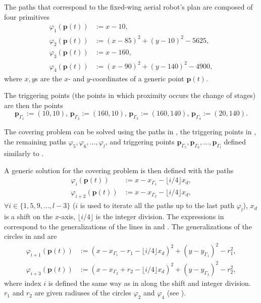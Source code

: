 The paths that correspond to the fixed-wing aerial robot's plan are composed of four primitives
\begin{subequations}\label{eq:basic-plan}\begin{align}
\varphi_1(\mathbf{p}(t))&:=x-10,\label{eq:line1}\\
\varphi_2(\mathbf{p}(t))&:=(x-85)^2+(y-10)^2-5625,\label{eq:circ1}\\
\varphi_3(\mathbf{p}(t))&:=x-160,\label{eq:line2}\\
\varphi_4(\mathbf{p}(t))&:=(x-90)^2+(y-140)^2-4900,\label{eq:circ2}\end{align}
\end{subequations}
where $x,y$s are the $x$- and $y$-coordinates of a generic point $\mathbf{p}(t)$. 

The triggering points (the points in which proximity occurs the change of stages) are then the points
\begin{equation}\label{eq:basic-plan-trigs}
  \mathbf{p}_{\Gamma_1}:=(10,10),\,\mathbf{p}_{\Gamma_2}:=(160,10),\,\mathbf{p}_{\Gamma_3}:=(160,140),\,\mathbf{p}_{\Gamma_4}:=(20,140).
\end{equation}

The covering problem can be solved using the paths in , the triggering points in , the remaining paths $\varphi_5,\varphi_6,\dots,\varphi_l$, and triggering points $\mathbf{p}_{\Gamma_5},\mathbf{p}_{\Gamma_6},\dots,\mathbf{p}_{\Gamma_l}$ defined similarly to .

A generic solution for the covering problem is then defined with the paths
\begin{subequations}\label{eq:line-gene}\begin{align}
  \varphi_i(\mathbf{p}(t))&:=x-x_{\Gamma_1}-\lfloor i/4\rfloor x_d,\\
  \varphi_{i+2}(\mathbf{p}(t))&:=x-x_{\Gamma_2}-\lfloor i/4\rfloor x_d,
\end{align}
\end{subequations}
$\forall i\in\{1,5,9,\dots,l-3\}$ ($i$ is used to iterate all the paths up to the last path $\varphi_l$), $x_d$ is a shift on the $x$-axis, $\lfloor i/4\rfloor$ is the integer division. The expressions in  correspond to the generalizations of the lines in  and . The generalizations of the circles in  and  are
\begin{subequations}\label{eq:circ-gene}\begin{align}
  \varphi_{i+1}(\mathbf{p}(t))&:=(x-x_{\Gamma_1}-r_1-\lfloor i/4\rfloor x_d)^2+(y-y_{\Gamma_1})^2-r_1^2,\\
  \varphi_{i+3}(\mathbf{p}(t))&:=(x-x_{\Gamma_2}+r_2-\lfloor i/4\rfloor x_d)^2+(y-y_{\Gamma_3})^2-r_2^2,\label{eq:second-circ-gene}
\end{align}
\end{subequations}
where index $i$ is defined the same way as in  along the shift and integer division. $r_1$ and $r_2$ are given radiuses of the circles $\varphi_2$ and $\varphi_4$ (see ).


